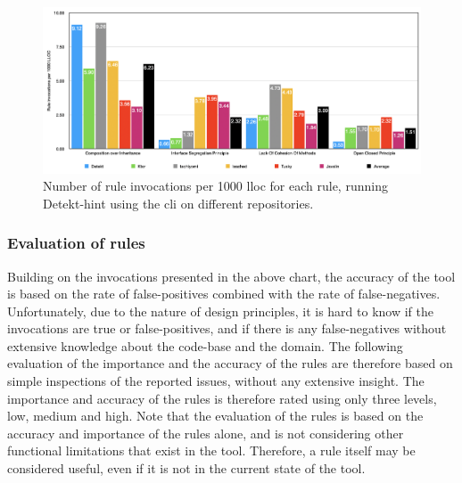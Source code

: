 \documentclass[pdftex,10pt,b5paper,twoside]{report}
\begin{document}
\begin{figure}[h!]
    \centering
    \includegraphics[width=\linewidth]{images/distribution.png}
    \caption{Number of rule invocations per 1000 \gls{lloc} for each rule, running Detekt-hint using the \gls{cli} on different repositories.}
    \label{fig:distribution}
\end{figure}


\subsubsection{Evaluation of rules}
\label{rule-evaluation}
Building on the invocations presented in the above chart, the accuracy of the tool is based on the rate of false-positives combined with the rate of false-negatives. Unfortunately, due to the nature of design principles, it is hard to know if the invocations are true or false-positives, and if there is any false-negatives without extensive knowledge about the code-base and the domain. The following evaluation of the importance and the accuracy of the rules are therefore based on simple inspections of the reported issues, without any extensive insight. The importance and accuracy of the rules is therefore rated using only three levels, low, medium and high. Note that the evaluation of the rules is based on the accuracy and importance of the rules alone, and is not considering other functional limitations that exist in the tool. Therefore, a rule itself may be considered useful, even if it is not in the current state of the tool.
\end{document}
